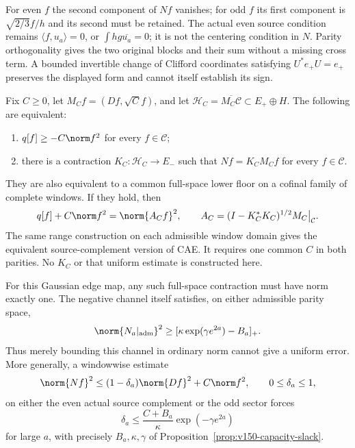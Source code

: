 For even $f$ the second component of $Nf$ vanishes; for odd $f$ its
first component is $\sqrt{2/3}f/h$ and its second must be retained.
The actual even source condition remains $\langle f,u_a\rangle=0$,
or $\int hg\overline{u_a}=0$; it is not the centering condition in
$N$. Parity orthogonality gives the two original blocks and their
sum without a missing cross term. A bounded invertible change of
Clifford coordinates satisfying $U^*e_+U=e_+$ preserves the displayed
form and cannot itself establish its sign.

\begin{proposition}
\label{prop:ns47-contraction}
Fix $C\ge0$, let $M_Cf=(Df,\sqrt C f)$, and let
$\mathcal H_C=\overline{M_C\mathcal C}\subset E_+\oplus H$.
The following are equivalent:
\begin{enumerate}[label=(\roman*)]
\item $q[f]\ge-C\norm f^2$ for every $f\in\mathcal C$;
\item there is a contraction $K_C:\mathcal H_C\to E_-$ such that
      $Nf=K_CM_Cf$ for every $f\in\mathcal C$.
\end{enumerate}
They are also equivalent to a common full-space lower floor on a
cofinal family of complete windows. If they hold, then
\begin{equation}\label{eq:ns47-positive-factor}
 q[f]+C\norm f^2=\norm{A_Cf}^2,\qquad
 A_C=(I-K_C^*K_C)^{1/2}M_C\big|_{\mathcal C}.
\end{equation}
The same range construction on each admissible window domain gives
the equivalent source-complement version of CAE. It requires one
common $C$ in both parities. No $K_C$ or that uniform estimate is
constructed here.

For this Gaussian edge map, any such full-space contraction must have
norm exactly one. The negative channel itself satisfies, on either
admissible parity space,
\begin{equation}\label{eq:ns47-negative-growth}
 \norm{N_a|_{\rm adm}}^2\ge
       [\kappa\exp(\gamma e^{2a})-B_a]_+.
\end{equation}
Thus merely bounding this channel in ordinary norm cannot give a
uniform error. More generally, a windowwise estimate
\begin{equation}\label{eq:ns47-strict-contraction}
 \norm{Nf}^2\le(1-\delta_a)\norm{Df}^2+C\norm f^2,
 \qquad 0\le\delta_a\le1,
\end{equation}
on either the even actual source complement or the odd sector forces
\begin{equation}\label{eq:ns47-critical-rate}
 \delta_a\le \frac{C+B_a}{\kappa}\exp(-\gamma e^{2a})
\end{equation}
for large $a$, with precisely $B_a,\kappa,\gamma$ of
Proposition~\ref{prop:v150-capacity-slack}.
\end{proposition}
